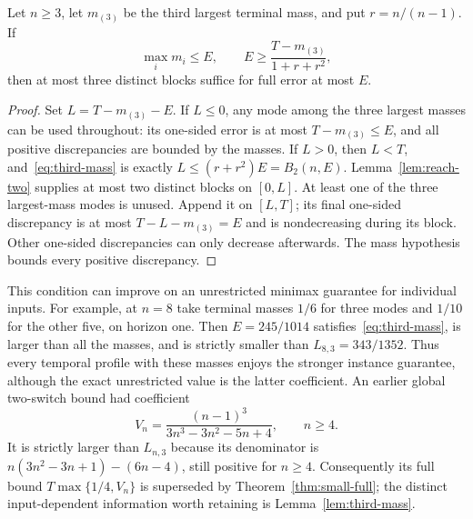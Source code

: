 \begin{lemma}
\label{lem:third-mass}
Let $n\ge3$, let $m_{(3)}$ be the third largest terminal mass, and put
$r=n/(n-1)$. If
\begin{equation}\label{eq:third-mass}
 \max_i m_i\le E,\qquad
 E\ge\frac{T-m_{(3)}}{1+r+r^2},
\end{equation}
then at most three distinct blocks suffice for full error at most $E$.
\end{lemma}
\begin{proof}
Set $L=T-m_{(3)}-E$. If $L\le0$, any mode among the three largest
masses can be used throughout: its one-sided error is at most
$T-m_{(3)}\le E$, and all positive discrepancies are bounded by the
masses. If $L>0$, then $L<T$, and~\eqref{eq:third-mass} is exactly
$L\le(r+r^2)E=B_2(n,E)$. Lemma~\ref{lem:reach-two} supplies at most
two distinct blocks on $[0,L]$. At least one of the three largest-mass
modes is unused. Append it on $[L,T]$; its final one-sided discrepancy
is at most $T-L-m_{(3)}=E$ and is nondecreasing during its block.
Other one-sided discrepancies can only decrease afterwards. The mass
hypothesis bounds every positive discrepancy.
\end{proof}

This condition can improve on an unrestricted minimax guarantee for
individual inputs. For example, at $n=8$ take terminal masses $1/6$
for three modes and $1/10$ for the other five, on horizon one. Then
$E=245/1014$ satisfies~\eqref{eq:third-mass}, is larger than all the
masses, and is strictly smaller than $L_{8,3}=343/1352$.
Thus every temporal profile with these masses enjoys the stronger
instance guarantee, although the exact unrestricted value is the latter
coefficient. An earlier global two-switch bound had coefficient
\[
 V_n=\frac{(n-1)^3}{3n^3-3n^2-5n+4},\qquad n\ge4.
\]
It is strictly larger than $L_{n,3}$ because its denominator is
$n(3n^2-3n+1)-(6n-4)$, still positive for $n\ge4$.
Consequently its full bound $T\max\{1/4,V_n\}$ is superseded by
Theorem~\ref{thm:small-full}; the distinct input-dependent information
worth retaining is Lemma~\ref{lem:third-mass}.

